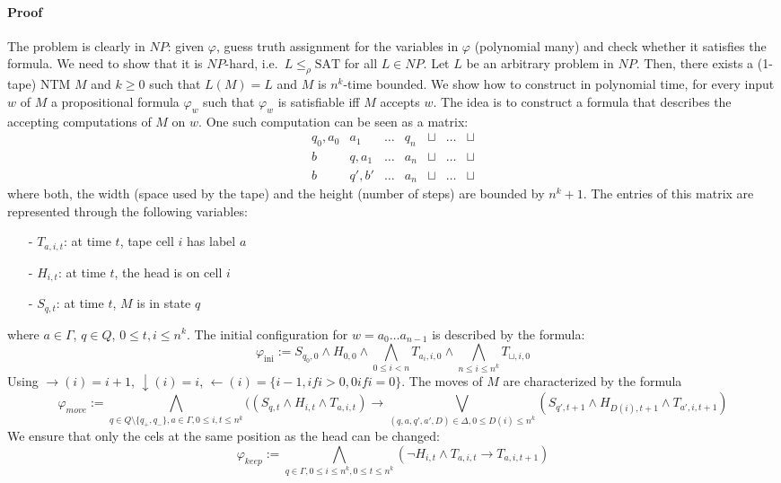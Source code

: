 \documentclass{report}
\begin{document}
\paragraph{Proof} The problem is clearly in $NP$: given $\varphi$, guess truth assignment for the variables in $\varphi$ (polynomial many) and check whether it satisfies the formula. We need to show that it is $NP$-hard, i.e.\ $L\leq_\rho \mathrm{SAT}$ for all $L \in NP$. Let $L$ be an arbitrary problem in $NP$. Then, there exists a (1-tape) NTM $M$ and $k\geq 0$ such that $L(M)=L$ and $M$ is $n^k$-time bounded. We show how to construct in polynomial time, for every input $w$ of $M$ a propositional formula $\varphi_w$ such that $\varphi_w$ is satisfiable iff $M$ accepts $w$. The idea is to construct a formula that describes the accepting computations of $M$ on $w$. One such computation can be seen as a matrix:
\[
\begin{array}{c|c|c|c|c|c|c}
q_0,a_0 & a_1 & \dots & q_n & \sqcup & \dots & \sqcup\\
b & q,a_1 & \dots & a_n & \sqcup & \dots & \sqcup\\
b & q',b' & \dots & a_n & \sqcup & \dots & \sqcup
\end{array}
\]
where both, the width (space used by the tape) and the height (number of steps) are bounded by $n^k+1$. The entries of this matrix are represented through the following variables:
\begin{itemize}
\item[-] $T_{a,i,t}$: at time $t$, tape cell $i$ has label $a$
\item[-] $H_{i,t}$: at time $t$, the head is on cell $i$
\item[-] $S_{q,t}$: at time $t$, $M$ is in state $q$
\end{itemize}
where $a\in\Gamma$, $q \in Q$, $0 \leq t,i \leq n^k$. The initial configuration for $w = a_0 \dots a_{n-1}$ is described by the formula:
\[ \varphi_{\text{ini}} := S_{q_0,0} \land H_{0,0} \land \bigwedge_{0\leq i<n} T_{a_i,i,0} \land \bigwedge_{n\leq i \leq n^k} T_{\sqcup,i,0} \]
Using $\rightarrow(i)=i+1$, $\downarrow(i)=i$, $\leftarrow(i)=\{i-1, if i>0, 0 if i=0\}$. The moves of $M$ are characterized by the formula 
\[
\varphi_{move} := \bigwedge_{q\in Q \setminus \{q_+,q_-\}, a \in \Gamma, 0\leq i,t\leq n^k}((S_{q,t} \land H_{i,t} \land T_{a,i,t}) \rightarrow \bigvee_{(q,a,q',a',D) \in \Delta, 0\leq D(i) \leq n^k}(S_{q',t+1} \land H_{D(i),t+1} \land T_{a',i,t+1})
\]
We ensure that only the cels at the same position as the head can be changed:
\[
\varphi_{keep} := \bigwedge_{q\in\Gamma,0\leq i \leq n^k, 0\leq t \leq n^k}(\neg H_{i,t} \land T_{a,i,t} \rightarrow T_{a,i,t+1})
\]
\end{document}
